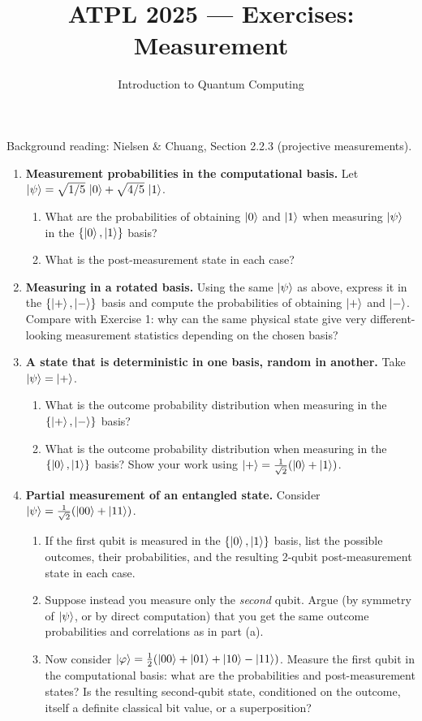 \documentclass[11pt]{article}
\title{ATPL 2025 --- Exercises: Measurement}
\author{Introduction to Quantum Computing}
\date{}
\begin{document}
\maketitle

Background reading: Nielsen \& Chuang, Section 2.2.3 (projective
measurements).

\begin{enumerate}[label=\textbf{Exercise \arabic*.}, leftmargin=2.2cm]

\item \textbf{Measurement probabilities in the computational basis.}
Let $\ket\psi = \sqrt{1/5}\,\ket0 + \sqrt{4/5}\,\ket1$.
\begin{enumerate}[label=(\alph*)]
\item What are the probabilities of obtaining $\ket0$ and $\ket1$ when
measuring $\ket\psi$ in the $\{\ket0,\ket1\}$ basis?
\item What is the post-measurement state in each case?
\end{enumerate}

\item \textbf{Measuring in a rotated basis.}
Using the same $\ket\psi$ as above, express it in the $\{\ket+,\ket-\}$
basis and compute the probabilities of obtaining $\ket+$ and $\ket-$.
Compare with Exercise 1: why can the same physical state give very
different-looking measurement statistics depending on the chosen basis?

\item \textbf{A state that is deterministic in one basis, random in
another.}
Take $\ket\psi = \ket+$.
\begin{enumerate}[label=(\alph*)]
\item What is the outcome probability distribution when measuring in the
$\{\ket+,\ket-\}$ basis?
\item What is the outcome probability distribution when measuring in the
$\{\ket0,\ket1\}$ basis? Show your work using
$\ket+=\tfrac1{\sqrt2}(\ket0+\ket1)$.
\end{enumerate}

\item \textbf{Partial measurement of an entangled state.}
Consider $\ket\psi = \tfrac1{\sqrt2}(\ket{00}+\ket{11})$.
\begin{enumerate}[label=(\alph*)]
\item If the first qubit is measured in the $\{\ket0,\ket1\}$ basis,
list the possible outcomes, their probabilities, and the resulting
2-qubit post-measurement state in each case.
\item Suppose instead you measure only the \emph{second} qubit. Argue
(by symmetry of $\ket\psi$, or by direct computation) that you get the
same outcome probabilities and correlations as in part (a).
\item Now consider $\ket\varphi = \tfrac12(\ket{00}+\ket{01}+\ket{10}-\ket{11})$.
Measure the first qubit in the computational basis: what are the
probabilities and post-measurement states? Is the resulting second-qubit
state, conditioned on the outcome, itself a definite classical bit
value, or a superposition?
\end{enumerate}


\end{enumerate}
\end{document}
